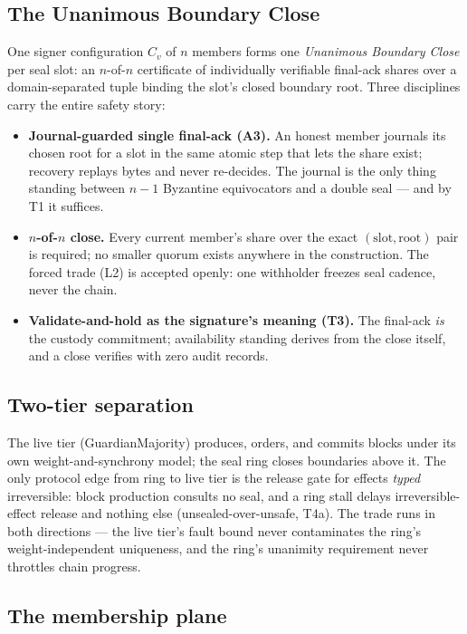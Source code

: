 \documentclass[11pt]{article}
\newcommand{\term}[1]{\textit{#1}}
\begin{document}
\subsection{The Unanimous Boundary Close}

One signer configuration \(C_v\) of \(n\) members forms one
\term{Unanimous Boundary Close} per seal slot: an \(n\)-of-\(n\)
certificate of individually verifiable final-ack shares over a
domain-separated tuple binding the slot's closed boundary root. Three
disciplines carry the entire safety story:

\begin{itemize}[leftmargin=1.5em]
\item \textbf{Journal-guarded single final-ack (A3).} An honest member
journals its chosen root for a slot in the same atomic step that lets the
share exist; recovery replays bytes and never re-decides. The journal is
the only thing standing between \(n-1\) Byzantine equivocators and a
double seal --- and by T1 it suffices.
\item \textbf{\(n\)-of-\(n\) close.} Every current member's share over the
exact \((\mathrm{slot}, \mathrm{root})\) pair is required; no smaller
quorum exists anywhere in the construction. The forced trade (L2) is
accepted openly: one withholder freezes seal cadence, never the chain.
\item \textbf{Validate-and-hold as the signature's meaning (T3).} The
final-ack \emph{is} the custody commitment; availability standing derives
from the close itself, and a close verifies with zero audit records.
\end{itemize}

\subsection{Two-tier separation}

The live tier (GuardianMajority) produces, orders, and commits blocks
under its own weight-and-synchrony model; the seal ring closes boundaries
above it. The only protocol edge from ring to live tier is the release
gate for effects \emph{typed} irreversible: block production consults no
seal, and a ring stall delays irreversible-effect release and nothing
else (unsealed-over-unsafe, T4a). The trade runs in both directions ---
the live tier's fault bound never contaminates the ring's
weight-independent uniqueness, and the ring's unanimity requirement never
throttles chain progress.

\subsection{The membership plane}
\end{document}
